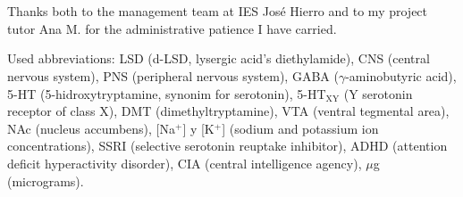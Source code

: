 \section*{}
\thispagestyle{empty}

Thanks both to the management team at IES José Hierro and to my project tutor Ana M. for the administrative patience I have carried.

Used abbreviations: LSD (d-LSD, lysergic acid's diethylamide), CNS (central nervous system), PNS (peripheral nervous system), GABA ($\gamma$-aminobutyric acid), 5-HT (5-hidroxytryptamine, synonim for serotonin), 5-HT$_{\textrm{XY}}$ (Y serotonin receptor of class X), DMT (dimethyltryptamine), VTA (ventral tegmental area), NAc (nucleus accumbens), [Na$^+$] y [K$^+$] (sodium and potassium ion concentrations), SSRI (selective serotonin reuptake inhibitor), ADHD (attention deficit hyperactivity disorder), CIA (central intelligence agency), $\mu$g (micrograms).
\clearpage

